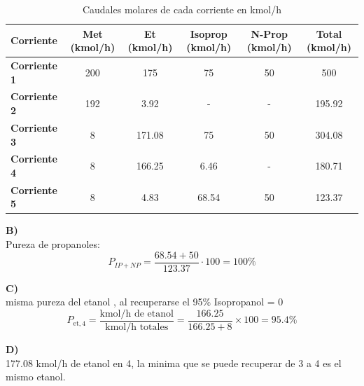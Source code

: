 \documentclass{report}
\begin{document}
\begin{table}[h]
    \centering
    \renewcommand{\arraystretch}{1.2}  %
    \begin{tabular}{lccccc}
        \toprule
        \textbf{Corriente} & \textbf{Met (kmol/h)} & \textbf{Et (kmol/h)} & \textbf{Isoprop (kmol/h)} & \textbf{N-Prop (kmol/h)}  & \textbf{Total (kmol/h)}\\
        \midrule
        \textbf{Corriente 1} & 200 & 175 & 75 & 50 & 500\\
        \textbf{Corriente 2} & 192 & 3.92 & - & - & 195.92\\
        \textbf{Corriente 3} & 8 & 171.08 & 75 & 50 & 304.08\\
        \textbf{Corriente 4} & 8 & 166.25 & 6.46 & - & 180.71\\
        \textbf{Corriente 5} & 8 & 4.83 & 68.54 & 50 & 123.37\\
        \bottomrule
    \end{tabular}
    \caption{Caudales molares de cada corriente en kmol/h}
    \label{tabla-caudales}
\end{table}
\begin{raggedright}
\textbf{B)}\\
\vspace{1\baselineskip}
Pureza de propanoles:\\
\begin{equation*}
	P_{IP + NP} = \frac{68.54 + 50}{123.37} \cdot 100 = 100\%
\end{equation*}

\textbf{C)}\\
\vspace{1\baselineskip}
misma pureza del etanol , al recuperarse el 95$\%$ Isopropanol = 0 
\begin{equation*}
		P_{\text{et},4} = \frac{\text{kmol/h de etanol}}{\text{kmol/h totales}} = \frac{166.25}{166.25 + 8} \times 100 = 95.4\%
\end{equation*}

\end{raggedright}
\vspace{2\baselineskip}
\textbf{D)}\\

177.08 kmol/h de etanol en 4, la minima que se puede recuperar de 3 a 4 es el mismo etanol.\\
	
\end{document}
